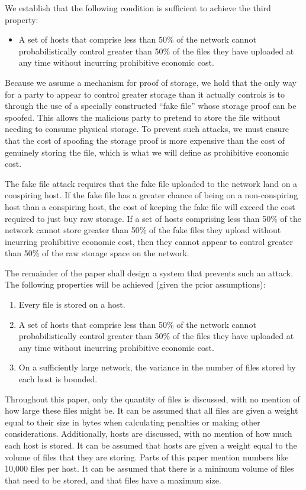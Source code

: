 \documentclass[twocolumn]{article}
\begin{document}
We establish that the following condition is sufficient to achieve the third property:
\begin{itemize}
	\item A set of hosts that comprise less than 50\% of the network cannot probabilistically control greater than 50\% of the files they have uploaded at any time without incurring prohibitive economic cost.
\end{itemize}
Because we assume a mechanism for proof of storage, we hold that the only way for a party to appear to control greater storage than it actually controls is to through the use of a specially constructed ``fake file'' whose storage proof can be spoofed.
This allows the malicious party to pretend to store the file without needing to consume physical storage.
To prevent such attacks, we must ensure that the cost of spoofing the storage proof is more expensive than the cost of genuinely storing the file, which is what we will define as prohibitive economic cost.

The fake file attack requires that the fake file uploaded to the network land on a conspiring host.
If the fake file has a greater chance of being on a non-conspiring host than a conspiring host, the cost of keeping the fake file will exceed the cost required to just buy raw storage.
If a set of hosts comprising less than 50\% of the network cannot store greater than 50\% of the fake files they upload without incurring prohibitive economic cost, then they cannot appear to control greater than 50\% of the raw storage space on the network.

The remainder of the paper shall design a system that prevents such an attack. The following properties will be achieved (given the prior assumptions):
\begin{enumerate}
	\item Every file is stored on a host.
	\item A set of hosts that comprise less than 50\% of the network cannot probabilistically control greater than 50\% of the files they have uploaded at any time without incurring prohibitive economic cost.
	\item On a sufficiently large network, the variance in the number of files stored by each host is bounded.
\end{enumerate}

Throughout this paper, only the quantity of files is discussed, with no mention of how large these files might be.
It can be assumed that all files are given a weight equal to their size in bytes when calculating penalties or making other considerations.
Additionally, hosts are discussed, with no mention of how much each host is stored.
It can be assumed that hosts are given a weight equal to the volume of files that they are storing.
Parts of this paper mention numbers like 10,000 files per host.
It can be assumed that there is a minimum volume of files that need to be stored, and that files have a maximum size.
\end{document}
